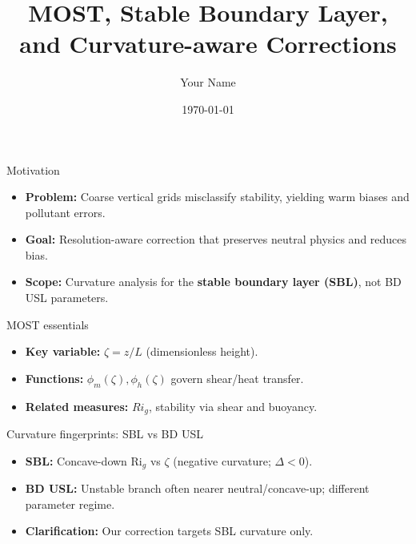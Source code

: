 \documentclass[aspectratio=169]{beamer}
\title{MOST, Stable Boundary Layer, and Curvature-aware Corrections}
\author{Your Name}
\date{\today}
\begin{document}
\maketitle

\begin{frame}{Motivation}
  \begin{itemize}
    \item \textbf{Problem:} Coarse vertical grids misclassify stability, yielding warm biases and pollutant errors.
    \item \textbf{Goal:} Resolution-aware correction that preserves neutral physics and reduces bias.
    \item \textbf{Scope:} Curvature analysis for the \textbf{stable boundary layer (SBL)}, not BD USL parameters.
  \end{itemize}
\end{frame}

\begin{frame}{MOST essentials}
  \begin{itemize}
    \item \textbf{Key variable:} \(\zeta = z/L\) (dimensionless height).
    \item \textbf{Functions:} \(\phi_m(\zeta), \phi_h(\zeta)\) govern shear/heat transfer.
    \item \textbf{Related measures:} \(Ri_g\), stability via shear and buoyancy.
  \end{itemize}
\end{frame}

\begin{frame}{Curvature fingerprints: SBL vs BD USL}
  \begin{center}
    
  \end{center}
  \begin{itemize}
    \item \textbf{SBL:} Concave-down Ri\(_g\) vs \(\zeta\) (negative curvature; \(\Delta < 0\)).
    \item \textbf{BD USL:} Unstable branch often nearer neutral/concave-up; different parameter regime.
    \item \textbf{Clarification:} Our correction targets SBL curvature only.
  \end{itemize}
\end{frame}
\end{document}
